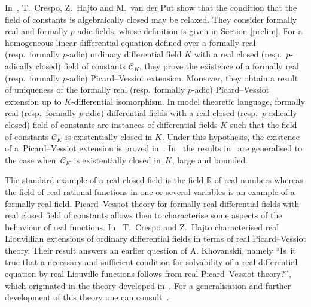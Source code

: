 \documentclass[10pt,a4paper]{amsart}
\numberwithin{equation}{section}
\newcommand{\R}{\mathbb{R}}
\begin{document}
In~\cite{CHP}, T.~Crespo, Z.~Hajto and M.~van der Put show that the condition that the field of constants is algebraically closed may be relaxed. They consider formally real and formally $p$-adic fields, whose definition is given in Section \ref{prelim}.
For a homogeneous linear differential equation defined over a formally real (resp.\ formally $p$-adic) ordinary differential field $K$ with a real closed (resp.\ $p$-adically closed) field of constants $\mathcal{C}_K$, they prove the existence of a formally real (resp.\ formally $p$-adic) Picard--Vessiot extension. Moreover, they obtain a result of uniqueness of the formally real (resp.\ formally $p$-adic) Picard--Vessiot extension up to $K$-differential isomorphism. In model theoretic language, formally real (resp.\ formally $p$-adic) differential fields with a real closed (resp.\ $p$-adically closed) field of constants are instances of differential fields $K$ such that the field of constants $\mathcal{C}_K$ is existentially closed in $K$. Under this hypothesis, the existence of a~Picard--Vessiot extension is proved in~\cite[Theorem~2.2]{GGO}. In~\cite{KP} the results in~\cite{CHP} are generalised to the case when~$\mathcal{C}_K$ is existentially closed in~$K$, large and bounded.

The standard example of a real closed field is the field $\R$ of real numbers whereas the field of real rational functions in one or several variables is an example of a formally real field. Picard--Vessiot theory for formally real differential fields with real closed field of constants allows then to characterise some aspects of the behaviour of real functions. In~\cite{CH} T.~Crespo and Z.~Hajto characterised real Liouvillian extensions of ordinary differential fields in terms of real Picard--Vessiot theory. Their result answers an earlier question of A. Khovanskii, namely ``Is~it true that a necessary and sufficient condition for solvability of a real differential equation by real Liouville functions follows from real Picard--Vessiot theory?'', which originated in the theory developed in~\cite{GK}. For a generalisation and further development of this theory one can consult~\cite{Kh}.
\end{document}
